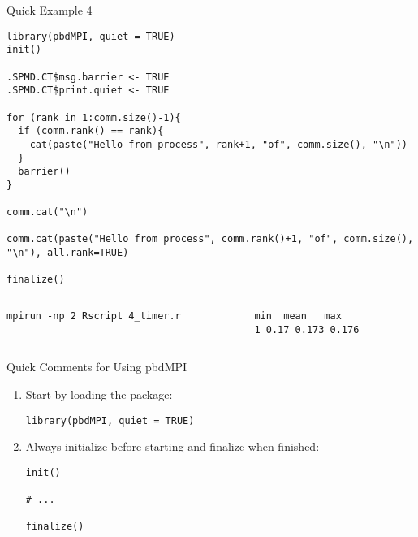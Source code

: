 \begin{frame}
  \begin{exampleblock}{Quick Example 4}
\begin{lstlisting}[title=Timing: timer.r]
library(pbdMPI, quiet = TRUE)
init()

.SPMD.CT$msg.barrier <- TRUE
.SPMD.CT$print.quiet <- TRUE

for (rank in 1:comm.size()-1){
  if (comm.rank() == rank){
    cat(paste("Hello from process", rank+1, "of", comm.size(), "\n"))
  }
  barrier()
}

comm.cat("\n")

comm.cat(paste("Hello from process", comm.rank()+1, "of", comm.size(), "\n"), all.rank=TRUE)

finalize()
\end{lstlisting}
  \begin{columns}[t,onlytextwidth]
    \begin{column}{0.58\textwidth}
\begin{lstlisting}[backgroundcolor=\color{white},keywordstyle=\color{black},title=Execute this script via:]
mpirun -np 2 Rscript 4_timer.r
\end{lstlisting}
\end{column}
    \hfill
    \begin{column}{0.35\textwidth}
\begin{lstlisting}[title=Sample Output:]
   min  mean   max
1 0.17 0.173 0.176
\end{lstlisting}
\end{column}
\end{columns}
  \end{exampleblock}
\end{frame}




\begin{frame}[fragile]
  \begin{block}{Quick Comments for Using pbdMPI}\pause
    \begin{enumerate}
      \item Start by loading the package:
\vspace{-.4cm}
\begin{lstlisting}
library(pbdMPI, quiet = TRUE)
\end{lstlisting}
      \item Always initialize before starting and finalize when finished:
\vspace{-.4cm}
\begin{lstlisting}
init()

# ...

finalize()
\end{lstlisting}
\end{enumerate}
\end{block}
\end{frame}